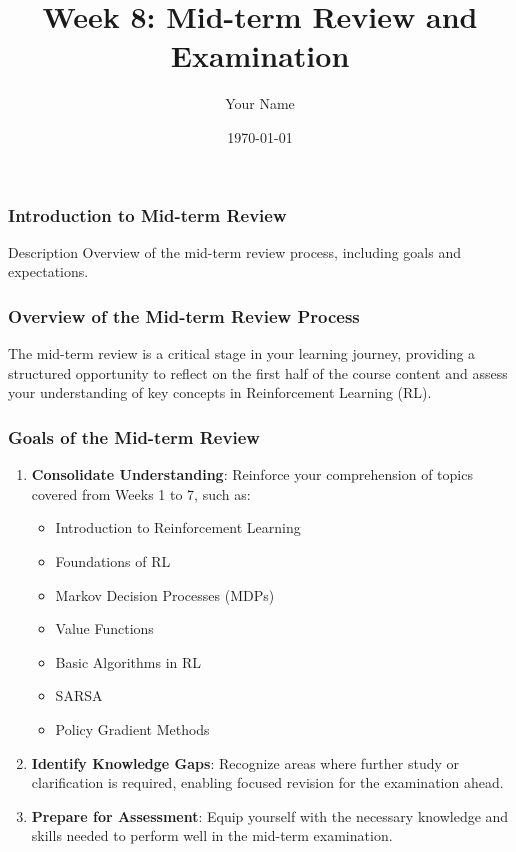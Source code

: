 \documentclass{beamer}
\title{Week 8: Mid-term Review and Examination}
\author{Your Name}
\institute{Your Institution}
\date{\today}
\begin{document}
\frame{\titlepage}

\begin{frame}[fragile]
    \frametitle{Introduction to Mid-term Review}
    \begin{block}{Description}
        Overview of the mid-term review process, including goals and expectations.
    \end{block}
\end{frame}

\begin{frame}[fragile]
    \frametitle{Overview of the Mid-term Review Process}
    The mid-term review is a critical stage in your learning journey, providing a structured opportunity to reflect on the first half of the course content and assess your understanding of key concepts in Reinforcement Learning (RL).
\end{frame}

\begin{frame}[fragile]
    \frametitle{Goals of the Mid-term Review}
    \begin{enumerate}
        \item \textbf{Consolidate Understanding}:
            Reinforce your comprehension of topics covered from Weeks 1 to 7, such as:
            \begin{itemize}
                \item Introduction to Reinforcement Learning
                \item Foundations of RL
                \item Markov Decision Processes (MDPs)
                \item Value Functions
                \item Basic Algorithms in RL
                \item SARSA
                \item Policy Gradient Methods
            \end{itemize}
        \item \textbf{Identify Knowledge Gaps}:
            Recognize areas where further study or clarification is required, enabling focused revision for the examination ahead.
        \item \textbf{Prepare for Assessment}:
            Equip yourself with the necessary knowledge and skills needed to perform well in the mid-term examination.
    \end{enumerate}
\end{frame}
\end{document}
